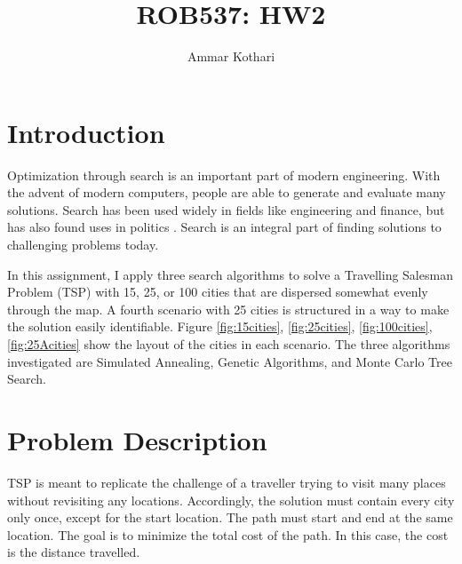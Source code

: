 \documentclass[a4paper]{article}
\title{ROB537: HW2}
\author{Ammar Kothari}
\begin{document}
\maketitle

\section{Introduction}
Optimization through search is an important part of modern engineering.  With the advent of modern computers, people are able to generate and evaluate many solutions.  Search has been used widely in fields like engineering and finance, but has also found uses in politics \cite{totenberg_2017}.  Search is an integral part of finding solutions to challenging problems today.

In this assignment, I apply three search algorithms to solve a Travelling Salesman Problem (TSP) with 15, 25, or 100 cities that are dispersed somewhat evenly through the map.  A fourth scenario with 25 cities is structured in a way to make the solution easily identifiable.  Figure \ref{fig:15cities}, \ref{fig:25cities}, \ref{fig:100cities}, \ref{fig:25Acities} show the layout of the cities in each scenario.  The three algorithms investigated are Simulated Annealing, Genetic Algorithms, and Monte Carlo Tree Search.

\section{Problem Description}
TSP is meant to replicate the challenge of a traveller trying to visit many places without revisiting any locations.  Accordingly, the solution must contain every city only once, except for the start location.  The path must start and end at the same location.  The goal is to minimize the total cost of the path.  In this case, the cost is the distance travelled.


















\end{document}
